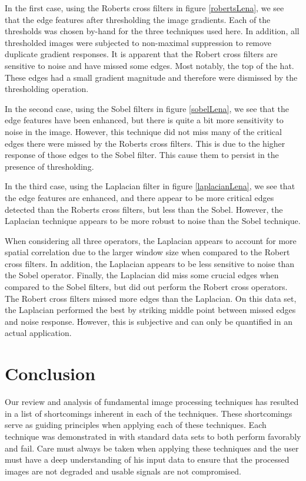\documentclass[journal]{IEEEtran}
\begin{document}
\par In the first case, using the Roberts cross filters in figure \ref{robertsLena}, we see that the edge features after thresholding the image gradients. Each of the thresholds was chosen by-hand for the three techniques used here. In addition, all thresholded images were subjected to non-maximal suppression to remove duplicate gradient responses. It is apparent that the Robert cross filters are sensitive to noise and have missed some edges. Most notably, the top of the hat. These edges had a small gradient magnitude and therefore were dismissed by the thresholding operation.
\par In the second case, using the Sobel filters in figure \ref{sobelLena}, we see that the edge features have been enhanced, but there is quite a bit more sensitivity to noise in the image. However, this technique did not miss many of the critical edges there were missed by the Roberts cross filters. This is due to the higher response of those edges to the Sobel filter. This cause them to persist in the presence of thresholding.
\par In the third case, using the Laplacian filter in figure \ref{laplacianLena}, we see that the edge features are enhanced, and there appear to be more critical edges detected than the Roberts cross filters, but less than the Sobel. However, the Laplacian technique appears to be more robust to noise than the Sobel technique.
\par When considering all three operators, the Laplacian appears to account for more spatial correlation due to the larger window size when compared to the Robert cross filters. In addition, the Laplacian appears to be less sensitive to noise than the Sobel operator. Finally, the Laplacian did miss some crucial edges when compared to the Sobel filters, but did out perform the Robert cross operators. The Robert cross filters missed more edges than the Laplacian. On this data set, the Laplacian performed the best by striking middle point between missed edges and noise response. However, this is subjective and can only be quantified in an actual application.

\section{Conclusion}
Our review and analysis of fundamental image processing techniques has resulted in a list of shortcomings inherent in each of the techniques. These shortcomings serve as guiding principles when applying each of these techniques. Each technique was demonstrated in with standard data sets to both perform favorably and fail. Care must always be taken when applying these techniques and the user must have a deep understanding of his input data to ensure that the processed images are not degraded and usable signals are not compromised.
\end{document}
